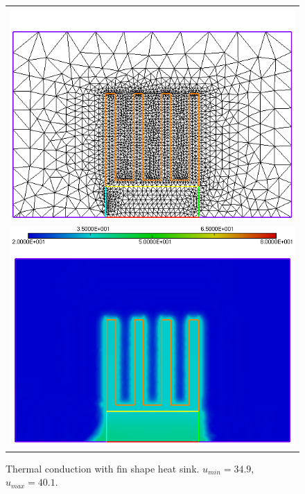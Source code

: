 \begin{figure}[h!]
	\centering
	\begin{tabular}{c}
		\includegraphics[width=.8\linewidth]{figures/finsinkc} \\ \includegraphics[width=.8\linewidth]{figures/finsinkb}
	\end{tabular}
	\caption{Thermal conduction with fin shape heat sink. $u_{min}=34.9$, $u_{max}=40.1$.}
\end{figure}
